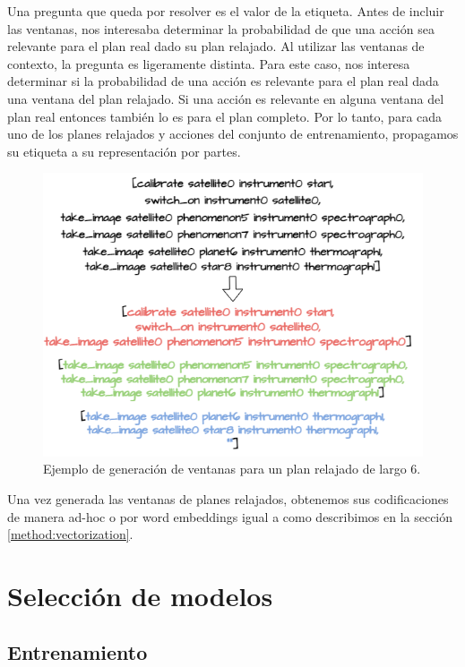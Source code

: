 Una pregunta que queda por resolver es el valor de la etiqueta. Antes de incluir
las ventanas, nos interesaba determinar la probabilidad de que una acción sea
relevante para el plan real dado su plan relajado. Al utilizar las ventanas de
contexto, la pregunta es ligeramente distinta. Para este caso, nos interesa
determinar si la probabilidad de una acción es relevante para el plan real dada
una ventana del plan relajado. Si una acción es relevante en alguna ventana del
plan real entonces también lo es para el plan completo. Por lo tanto, para cada
uno de los planes relajados y acciones del conjunto de entrenamiento, propagamos
su etiqueta a su representación por partes.

\begin{figure}[t!]
    \centering
    \includegraphics[width=\linewidth]{figures/window_example.png}
    \caption{Ejemplo de generación de ventanas para un plan relajado de largo 6.}
    \label{fig:window_example}
\end{figure}

Una vez generada las ventanas de planes relajados, obtenemos sus codificaciones
de manera ad-hoc o por word embeddings igual a como describimos en la sección
\ref{method:vectorization}.

\section{Selección de modelos}
\label{method:model_selection}

\subsection{Entrenamiento}

